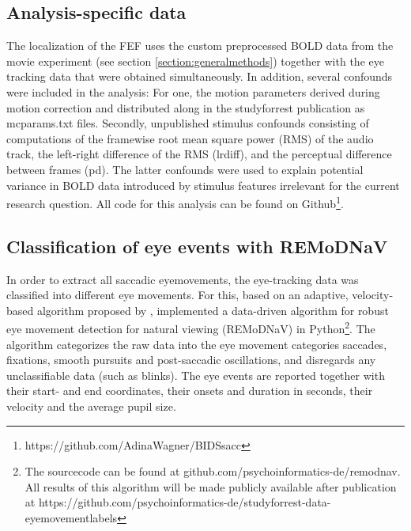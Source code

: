 \documentclass[a4paper, 12pt]{scrreprt}
\begin{document}
\subsection{Analysis-specific data}
The localization of the FEF uses the custom preprocessed BOLD data from the movie experiment (see section \ref{section:generalmethods}) together with the eye tracking data that were obtained simultaneously. 
In addition, several confounds were included in the analysis: For one, the motion parameters derived during motion correction and distributed along in the studyforrest publication as mcparams.txt files. Secondly, unpublished stimulus confounds consisting of computations of the framewise root mean square power (RMS) of the audio track, the left-right difference of the RMS (lrdiff), and the perceptual difference between frames (pd). The latter confounds were used to explain potential variance in BOLD data introduced by stimulus features irrelevant for the current research question. All code for this analysis can be found on Github\footnote{https://github.com/AdinaWagner/BIDSsacc}.


\subsection{Classification of eye events with REMoDNaV}\label{c2:remodnav}

In order to extract all saccadic eyemovements, the eye-tracking data was classified into different eye movements. For this, based on an adaptive, velocity-based algorithm proposed by \textcite{nystrom2010adaptive}, \textcite{dar2019} implemented a data-driven algorithm for robust eye movement detection for natural viewing (REMoDNaV) in Python\footnote{The sourcecode can be found at github.com/psychoinformatics-de/remodnav. All results of this algorithm will be made publicly available after publication at https://github.com/psychoinformatics-de/studyforrest-data-eyemovementlabels}. The algorithm categorizes the raw data into the eye movement categories saccades, fixations, smooth pursuits and post-saccadic oscillations, and disregards any unclassifiable data (such as blinks). The eye events are reported together with their start- and end coordinates, their onsets and duration in seconds, their velocity and the average pupil size.
\end{document}
